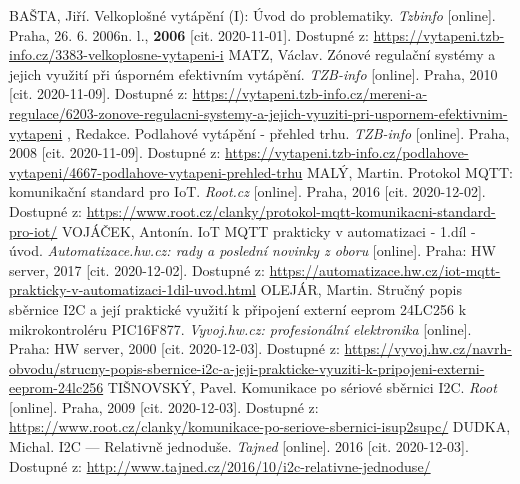 \begin{thebibliography}{3}
BAŠTA, Jiří. Velkoplošné vytápění (I): Úvod do problematiky. \textit{Tzbinfo} [online]. Praha, 26. 6. 2006n. l., \textbf{2006} [cit. 2020-11-01]. Dostupné z: \url{https://vytapeni.tzb-info.cz/3383-velkoplosne-vytapeni-i}
MATZ, Václav. Zónové regulační systémy a jejich využití při úsporném efektivním vytápění. \textit{TZB-info} [online]. Praha, 2010 [cit. 2020-11-09]. Dostupné z: \url{https://vytapeni.tzb-info.cz/mereni-a-regulace/6203-zonove-regulacni-systemy-a-jejich-vyuziti-pri-uspornem-efektivnim-vytapeni}
, Redakce. Podlahové vytápění - přehled trhu. \textit{TZB-info} [online]. Praha, 2008 [cit. 2020-11-09]. Dostupné z: \url{https://vytapeni.tzb-info.cz/podlahove-vytapeni/4667-podlahove-vytapeni-prehled-trhu}
MALÝ, Martin. Protokol MQTT: komunikační standard pro IoT. \textit{Root.cz} [online]. Praha, 2016 [cit. 2020-12-02]. Dostupné z: \url{https://www.root.cz/clanky/protokol-mqtt-komunikacni-standard-pro-iot/}
VOJÁČEK, Antonín. IoT MQTT prakticky v automatizaci - 1.díl - úvod. \textit{Automatizace.hw.cz: rady a poslední novinky z oboru} [online]. Praha: HW server, 2017 [cit. 2020-12-02]. Dostupné z: \url{https://automatizace.hw.cz/iot-mqtt-prakticky-v-automatizaci-1dil-uvod.html}
OLEJÁR, Martin. Stručný popis sběrnice I2C a její praktické využití k připojení externí eeprom 24LC256 k mikrokontroléru PIC16F877. \textit{Vyvoj.hw.cz: profesionální elektronika} [online]. Praha: HW server, 2000 [cit. 2020-12-03]. Dostupné z: \url{https://vyvoj.hw.cz/navrh-obvodu/strucny-popis-sbernice-i2c-a-jeji-prakticke-vyuziti-k-pripojeni-externi-eeprom-24lc256}
TIŠNOVSKÝ, Pavel. Komunikace po sériové sběrnici I2C. \textit{Root} [online]. Praha, 2009 [cit. 2020-12-03]. Dostupné z: \url{https://www.root.cz/clanky/komunikace-po-seriove-sbernici-isup2supc/}
DUDKA, Michal. I2C --- Relativně jednoduše. \textit{Tajned} [online]. 2016 [cit. 2020-12-03]. Dostupné z: \url{http://www.tajned.cz/2016/10/i2c-relativne-jednoduse/}

\end{thebibliography}
